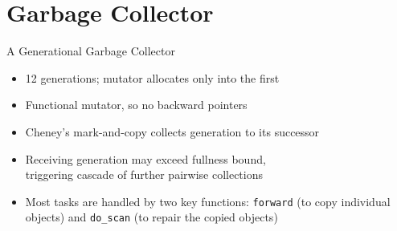 \documentclass[professionalfonts, xcolor=table]{beamer}
\begin{document}
\section{Garbage Collector}

\begin{frame}{A Generational Garbage Collector}
  \begin{itemize}
  \item 12 generations; mutator allocates only into the first
  \item Functional mutator, so no backward pointers
  \pause
  \item Cheney's mark-and-copy collects generation to its successor
  \item Receiving generation may exceed fullness bound, \\
  triggering cascade of further pairwise collections
  \pause
  \item Most tasks are handled by two key functions: \texttt{forward} (to copy
  individual objects) and \texttt{do\_scan} (to repair the copied objects)
  \end{itemize}
\end{frame}

\usetikzlibrary{positioning}
\end{document}
